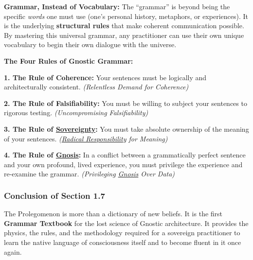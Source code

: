 \documentclass{article}
\begin{document}
\begin{nobullet}
    \item \textbf{Grammar, Instead of Vocabulary:} The ``grammar'' is beyond being the specific \textit{words} one must use (one's personal history, metaphors, or experiences). It is the underlying \textbf{structural rules} that make coherent communication possible. By mastering this universal grammar, any practitioner can use their own unique vocabulary to begin their own dialogue with the universe.
    \item \textbf{The Four Rules of Gnostic Grammar:}
    \begin{nobullet}
        \item \textbf{1. The Rule of Coherence:} Your sentences must be logically and architecturally consistent. \textit{(Relentless Demand for Coherence)}
        \item \textbf{2. The Rule of Falsifiability:} You must be willing to subject your sentences to rigorous testing. \textit{(Uncompromising Falsifiability)}
        \item \textbf{3. The Rule of \hyperlink{gloss:sovereignty}{Sovereignty}:} You must take absolute ownership of the meaning of your sentences. \textit{(\hyperlink{gloss:radical_responsibility}{Radical Responsibility} for Meaning)}
        \item \textbf{4. The Rule of \hyperlink{gloss:gnosis}{Gnosis}:} In a conflict between a grammatically perfect sentence and your own profound, lived experience, you must privilege the experience and re-examine the grammar. \textit{(Privileging \hyperlink{gloss:gnosis}{Gnosis} Over Data)}
    \end{nobullet}
\end{nobullet}

\subsubsection*{Conclusion of Section 1.7} \label{conclusion_of_section_1_7}

The Prolegomenon is more than a dictionary of new beliefs. It is the first \textbf{Grammar Textbook} for the lost science of Gnostic architecture. It provides the physics, the rules, and the methodology required for a sovereign practitioner to learn the native language of consciousness itself and to become fluent in it once again.
\end{document}
